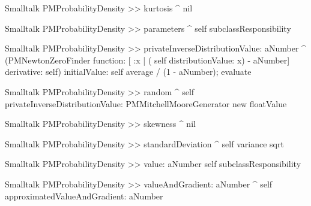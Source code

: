 \begin{displaycode}{Smalltalk}
PMProbabilityDensity >> kurtosis
    ^ nil
\end{displaycode}

\begin{displaycode}{Smalltalk}
PMProbabilityDensity >> parameters
    ^ self subclassResponsibility
\end{displaycode}


\begin{displaycode}{Smalltalk}
PMProbabilityDensity >> privateInverseDistributionValue: aNumber
    ^ (PMNewtonZeroFinder function: [ :x | ( self distributionValue: 
                                       x) - aNumber] derivative: self)
        initialValue: self average / (1 - aNumber); evaluate
\end{displaycode}

\begin{displaycode}{Smalltalk}
PMProbabilityDensity >> random
    ^ self privateInverseDistributionValue: PMMitchellMooreGenerator 
                                                        new floatValue
\end{displaycode}

\begin{displaycode}{Smalltalk}
PMProbabilityDensity >> skewness
    ^ nil
\end{displaycode}

\begin{displaycode}{Smalltalk}
PMProbabilityDensity >> standardDeviation
    ^ self variance sqrt
\end{displaycode}

\begin{displaycode}{Smalltalk}
PMProbabilityDensity >> value: aNumber
    self subclassResponsibility
\end{displaycode}

\begin{displaycode}{Smalltalk}
    PMProbabilityDensity >> valueAndGradient: aNumber
    ^ self approximatedValueAndGradient: aNumber
\end{displaycode}

